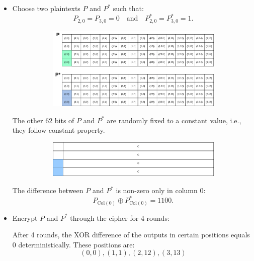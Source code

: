 \documentclass[journal=tosc,preprint]{iacrtrans}
\begin{document}
\begin{itemize}
    \item Choose two plaintexts $P$ and $P^*$ such that:
\[
P_{2,0} = P_{3,0} = 0 \quad \text{and} \quad P^*_{2,0} = P^*_{3,0} = 1.
\]
\begin{figure}[h!]
    \centering
    \begin{subfigure}[b]{0.6\textwidth}
        \centering
        \includegraphics[width=\textwidth]{pt.drawio.png} %
        \label{fig:image1}
    \end{subfigure}
\end{figure}

The other 62 bits of $P$ and $P^*$ are randomly fixed to a constant value, i.e., they follow constant property.
\begin{figure}[h!]
    \centering
    \begin{subfigure}[b]{0.6\textwidth}
        \centering
        \includegraphics[width=\textwidth]{all1.drawio.png} %
        \label{fig:image1}
    \end{subfigure}
\end{figure}

The difference between $P$ and $P^*$ is non-zero only in column 0:
\[
P_{\text{Col}(0)} \oplus P^*_{\text{Col}(0)} = 1100.
\]

\item Encrypt $P$ and $P^*$ through the cipher for 4 rounds:

After 4 rounds, the XOR difference of the outputs in certain positions equals 0 deterministically. These positions are:
\[
(0, 0), (1, 1), (2, 12), (3, 13)
\]
\end{itemize}
\end{document}
